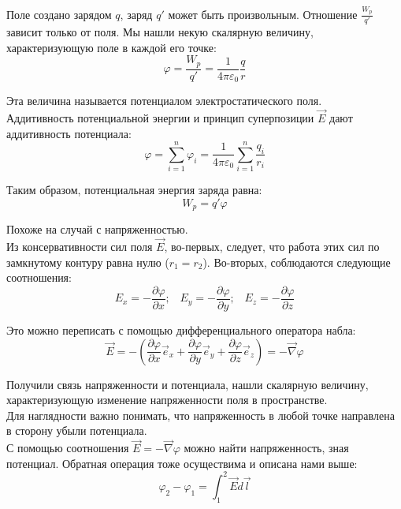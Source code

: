 \documentclass{article}
\begin{document}
	Поле создано зарядом $q$, заряд $q'$ может быть произвольным. Отношение $\frac{W_p}{q'}$ зависит только от поля. Мы нашли некую скалярную величину, характеризующую поле в каждой его точке:
	\begin{equation}
		\varphi = \frac{W_p}{q'} = \frac{1}{4\pi\varepsilon_0}\frac{q}{r}
	\end{equation}

	Эта величина называется потенциалом электростатического поля.\\

	Аддитивность потенциальной энергии и принцип суперпозиции $\vec E$ дают аддитивность потенциала:
	\begin{equation}
		\varphi = \sum_{i=1}^n \varphi_i = \frac{1}{4\pi\varepsilon_0}\sum_{i=1}^{n}\frac{q_i}{r_i}
	\end{equation}

	Таким образом, потенциальная энергия заряда равна:
	\begin{equation}
		W_p = q'\varphi
	\end{equation}

	Похоже на случай с напряженностью.\\

	Из консервативности сил поля $\vec E$, во-первых, следует, что работа этих сил по замкнутому контуру равна нулю ($r_1=r_2$). Во-вторых, соблюдаются следующие соотношения:
	\begin{equation}
		E_x = -\frac{\partial\varphi}{\partial x}; \;\;\;
		E_y = -\frac{\partial\varphi}{\partial y}; \;\;\;
		E_z = -\frac{\partial\varphi}{\partial z}
	\end{equation}

	Это можно переписать с помощью дифференциального оператора набла:
	\begin{equation}
		\vec E = -(\frac{\partial\varphi}{\partial x}\vec e_x + \frac{\partial\varphi}{\partial y}\vec e_y + \frac{\partial\varphi}{\partial z}\vec e_z) = -\vec\nabla \varphi
	\end{equation}

	Получили связь напряженности и потенциала, нашли скалярную величину, характеризующую изменение напряженности поля в пространстве.\\

	Для наглядности важно понимать, что напряженность в любой точке направлена в сторону убыли потенциала.\\

	С помощью соотношения $\vec E = -\vec\nabla\varphi$ можно найти напряженность, зная потенциал. Обратная операция тоже осуществима и описана нами выше:
	\begin{equation}
		\varphi_2-\varphi_1 = \int_1^2 \vec E d\vec l
	\end{equation}
\end{document}
